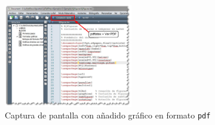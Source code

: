 \documentclass[11pt,a4paper]{article}
\begin{document}
\begin{figure}[htb]
	\centering
	\includegraphics[width=0.5\textwidth]{texmk03} 
	\caption[Captura con gráfico en \texttt{pdf}]{Captura de pantalla con añadido gráfico en formato \texttt{pdf}}
	\label{fig:texmk03}
\end{figure}
\end{document}
